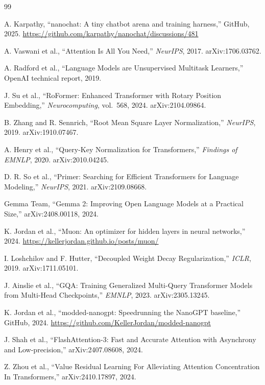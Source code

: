 \documentclass[11pt]{article}
\begin{document}
\newpage
\begin{thebibliography}{99}

A. Karpathy, ``nanochat: A tiny chatbot arena and training harness,'' GitHub, 2025. \url{https://github.com/karpathy/nanochat/discussions/481}

A. Vaswani et al., ``Attention Is All You Need,'' \textit{NeurIPS}, 2017. arXiv:1706.03762.

A. Radford et al., ``Language Models are Unsupervised Multitask Learners,'' OpenAI technical report, 2019.

J. Su et al., ``RoFormer: Enhanced Transformer with Rotary Position Embedding,'' \textit{Neurocomputing}, vol.~568, 2024. arXiv:2104.09864.

B. Zhang and R. Sennrich, ``Root Mean Square Layer Normalization,'' \textit{NeurIPS}, 2019. arXiv:1910.07467.

A. Henry et al., ``Query-Key Normalization for Transformers,'' \textit{Findings of EMNLP}, 2020. arXiv:2010.04245.

D. R. So et al., ``Primer: Searching for Efficient Transformers for Language Modeling,'' \textit{NeurIPS}, 2021. arXiv:2109.08668.

Gemma Team, ``Gemma 2: Improving Open Language Models at a Practical Size,'' arXiv:2408.00118, 2024.

K. Jordan et al., ``Muon: An optimizer for hidden layers in neural networks,'' 2024. \url{https://kellerjordan.github.io/posts/muon/}

I. Loshchilov and F. Hutter, ``Decoupled Weight Decay Regularization,'' \textit{ICLR}, 2019. arXiv:1711.05101.

J. Ainslie et al., ``GQA: Training Generalized Multi-Query Transformer Models from Multi-Head Checkpoints,'' \textit{EMNLP}, 2023. arXiv:2305.13245.

K. Jordan et al., ``modded-nanogpt: Speedrunning the NanoGPT baseline,'' GitHub, 2024. \url{https://github.com/KellerJordan/modded-nanogpt}

J. Shah et al., ``FlashAttention-3: Fast and Accurate Attention with Asynchrony and Low-precision,'' arXiv:2407.08608, 2024.

Z. Zhou et al., ``Value Residual Learning For Alleviating Attention Concentration In Transformers,'' arXiv:2410.17897, 2024.


\end{thebibliography}
\end{document}
